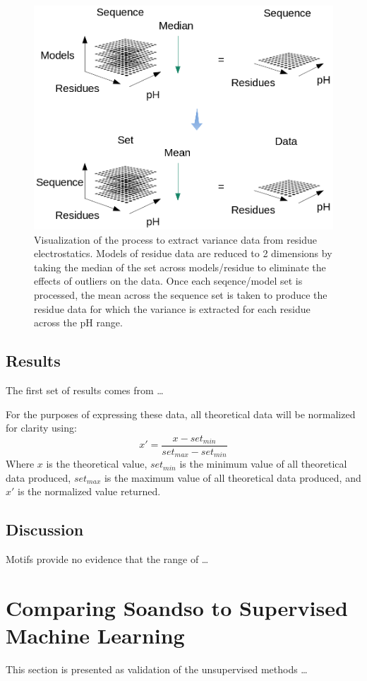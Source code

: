 \begin{figure}
\centering
\includegraphics[width=0.7\linewidth]{images/EVM}
\caption{Visualization of the process to extract variance data from residue electrostatics. Models of residue data are reduced to 2 dimensions by taking the median of the set across models/residue to eliminate the effects of outliers on the data. Once each seqence/model set is processed, the mean across the sequence set is taken to produce the residue data for which the variance is extracted for each residue across the pH range.}
\label{fig:evm}
\end{figure}


\subsection{Results}
The first set of results comes from \dots

For the purposes of expressing these data, all theoretical data will be normalized for clarity using:
\[ x' = \dfrac {x - set_{min}}{set_{max} - set_{min}}
 \]
Where $x$ is the theoretical value, $set_{min}$ is the minimum value of all theoretical data produced, $set_{max}$ is the maximum value of all theoretical data produced, and $x'$ is the normalized value returned.

\subsection{Discussion}
Motifs provide no evidence that the range of \dots

\section{Comparing Soandso to Supervised Machine Learning}
This section is presented as validation of the unsupervised methods \dots 

